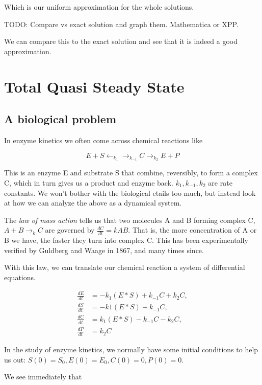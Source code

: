 \documentclass[12pt]{article}
\begin{document}
Which is our uniform approximation for the whole solutions.

TODO: Compare vs exact solution and graph them. Mathematica or XPP.

We can compare this to the exact solution and see that it is indeed a good
approximation.

\section{Total Quasi Steady State}

\subsection{A biological problem}

In enzyme kinetics we often come across chemical reactions like

\begin{equation}
E + S \leftarrow_{k_1} \rightarrow_{k_{-1}} C \rightarrow_{k_2} E + P
\end{equation}

This is an enzyme E and substrate S that combine, reversibly, to form a complex
C, which in turn gives us a product and enzyme back. $k_1, k_{-1}, k_2$ are rate
constants. We won't bother with the biological etails too much, but instead look
at how we can analyze the above as a dynamical system.

The \textit{law of mass action} tells us that two molecules A and B forming
complex C, $A+B \rightarrow_k C$ are governed by $\frac{dC}{dt} = kAB$. That is,
the more concentration of A or B we have, the faster they turn into complex C.
This has been experimentally verified by Guldberg and Waage in 1867, and many
times since.

With this law, we can translate our chemical reaction a system of differential
equations.

\begin{align}
\frac{dE}{dt} &= -k_1(E*S) + k_{-1}C + k_2C, \\
\frac{dS}{dt} &= -k1(E*S) + k_{-1}C, \\
\frac{dC}{dt} &= k_1(E*S) - k_{-1}C - k_2C, \\
\frac{dP}{dt} &= k_2C
\end{align}

In the study of enzyme kinetics, we normally have some initial conditions to help
us out: $S(0) = S_0, E(0) = E_0, C(0)=0, P(0)=0$.

We see immediately that
\end{document}
